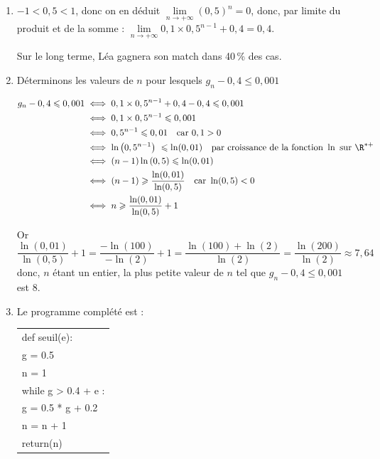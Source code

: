 \begin{enumerate}
	or $0,5 > 0$ et $0,1> 0$ donc $g_{n+1}- g_{n}< 0 \iff g_{n+1} <  g_{n}$

	La suite $\left(g_n\right)$ est strictement décroissante.


	\item   $-1 < 0,5<1$, donc on en déduit $\lim\limits_{n \to +\infty} \left(0,5\right)^n = 0$, donc, par limite du produit et de la somme : $\lim\limits_{n \to +\infty} 0,1 \times 0,5^{n-1}+0,4 = 0,4$.

	Sur le long terme, Léa gagnera son match dans 40\,\% des cas.
	\item  Déterminons les valeurs de $n$ pour lesquels  $g_n-0,4\leqslant 0,001$

	$\begin{aligned} g_n-0,4\leqslant 0,001 & \iff 0,1 \times 0,5^{n-1}+0,4 -0,4 \leqslant 0,001 \\
	&\iff 0,1 \times 0,5^{n-1} \leqslant 0,001 \\
		&\iff 0,5^{n-1} \leqslant 0,01 \quad \text {car } 0,1>0\\
	&\iff \ln\left( 0,5^{n-1} \right)\ \leqslant \ln(0,01) \quad \text{par croissance de la fonction } \ln \text{ sur }\R^{*+}\\
	&\iff(n-1) \ln\left( 0,5 \right) \leqslant \ln(0,01) \\
	&\iff(n-1) \geqslant \dfrac{\ln(0,01)}{\ln(0,5)} \quad \text {car } \ln(0,5)<0\\
	&\iff n \geqslant \dfrac{\ln(0,01)}{\ln(0,5)} +1 	\end{aligned}$


	Or  $\dfrac{\ln(0,01)}{\ln(0,5)} +1 = \dfrac{-\ln(100)}{-\ln(2)} + 1 = \dfrac{\ln(100)+ \ln(2)}{\ln(2)} = \dfrac{\ln(200)}{\ln(2)} \approx 7,64$ donc, $n$ étant un entier, la plus petite valeur de $n$ tel que $g_n-0,4\leqslant 0,001$ est 8.

	\item Le programme complété est :

	\begin{center}
		\ttfamily
		\begin{tabularx}{10cm}{|X|}\hline
			def seuil(e):\\
			\quad g = 0.5\\
			\quad n = 1\\
			\quad while {g \red > 0.4 + e} :\\
			\quad \quad g =  0.5 * g + 0.2\\
			\quad \quad n = {\red n + 1}\\
			\quad return(n)\\ \hline
		\end{tabularx}
	\end{center}
\end{enumerate}
